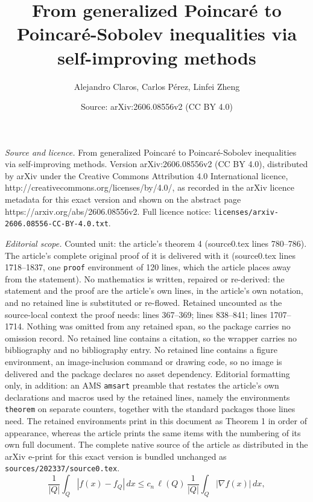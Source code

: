 \documentclass[10pt,a4paper]{amsart}
\title{From generalized Poincar\'e to Poincar\'e-Sobolev inequalities via self-improving methods}
\author{Alejandro Claros, Carlos P\'erez, Linfei Zheng}
\date{Source: arXiv:2606.08556v2 (CC BY 4.0)}
\begin{document}
\maketitle

\noindent\emph{Source and licence.} From generalized Poincar\'e to Poincar\'e-Sobolev inequalities via self-improving methods. Version arXiv:2606.08556v2 (CC BY 4.0), distributed by arXiv under the Creative Commons Attribution 4.0 International licence, http://creativecommons.org/licenses/by/4.0/, as recorded in the arXiv licence metadata for this exact version and shown on the abstract page https://arxiv.org/abs/2606.08556v2. Full licence notice: \texttt{licenses/arxiv-2606.08556-CC-BY-4.0.txt}.\par\smallskip

\noindent\textit{Editorial scope.} Counted unit: the article's theorem 4 (source0.tex lines 780--786). The article's complete original proof of it is delivered with it (source0.tex lines 1718--1837, one \texttt{proof} environment of 120 lines, which the article places away from the statement). No mathematics is written, repaired or re-derived: the statement and the proof are the article's own lines, in the article's own notation, and no retained line is substituted or re-flowed.  Retained uncounted as the source-local context the proof needs: lines 367--369; lines 838--841; lines 1707--1714.  Nothing was omitted from any retained span, so the package carries no omission record.  No retained line contains a citation, so the wrapper carries no bibliography and no bibliography entry.  No retained line contains a figure environment, an image-inclusion command or drawing code, so no image is delivered and the package declares no asset dependency.  Editorial formatting only, in addition: an AMS \texttt{amsart} preamble that restates the article's own declarations and macros used by the retained lines, namely the environments \texttt{theorem} on separate counters, together with the standard packages those lines need.  The retained environments print in this document as Theorem 1 in order of appearance, whereas the article prints the same items with the numbering of its own full document.  The complete native source of the article as distributed in the arXiv e-print for this exact version is bundled unchanged as \texttt{sources/202337/source0.tex}.
\begin{equation}\label{I1 P11}
	\frac{1}{|Q|}\int_Q |f(x)-f_Q|\,dx \le c_n \,\ell(Q)\,\frac{1}{|Q|}\int_Q |\nabla f(x)|\,dx, 
\end{equation} 
\end{document}

